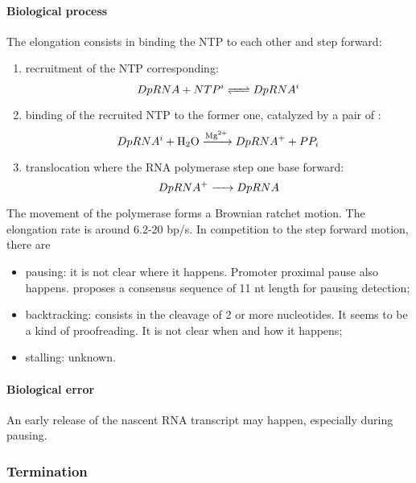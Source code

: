 \paragraph{Biological process} The elongation consists in binding the NTP to each other and step forward:
\begin{enumerate}
  \item recruitment of the NTP corresponding:
    $$
      \reactionRev{DpRNA + NTP^i}{DpRNA^i}{}{} \\
    $$
  \item binding of the recruited NTP to the former one, catalyzed by a pair of :
    $$
      \reactionIrr{DpRNA^i + \ce{H2O}}{DpRNA^+ + PP_i}{\ce{Mg^2+}}{} \\
    $$
  \item translocation where the RNA polymerase step one base forward:
    $$
      \reactionIrr{DpRNA^+}{DpRNA}{}{} \\
    $$
\end{enumerate}
The movement of the polymerase forms a Brownian ratchet motion. The elongation rate is around 6.2-20 bp/s. In competition to the step forward motion, there are
\begin{itemize}
  \item pausing: it is not clear where it happens. Promoter proximal pause also happens. \cite{LaW+:14} proposes a consensus sequence of 11 nt length for pausing detection;
  \item backtracking: consists in the cleavage of 2 or more nucleotides. It seems to be a kind of proofreading. It is not clear when and how it happens;
  \item stalling: unknown.
\end{itemize}


\paragraph{Biological error} An early release of the nascent RNA transcript may happen, especially during pausing.


\subsubsection{Termination}
